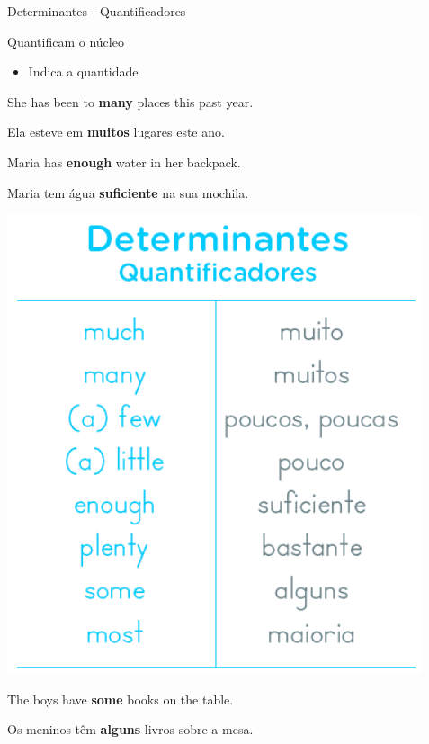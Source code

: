 \documentclass[compress,mathserif,xcolor=table]{beamer}
\begin{document}

\begin{frame}{Determinantes - Quantificadores}

\begin{minipage}{.54\textwidth}
Quantificam o núcleo
\begin{itemize}
    \item Indica a quantidade
\end{itemize}

\vspace{0.5cm}

She has been to \textbf{many} places this past year.

Ela esteve em \textbf{muitos} lugares este ano.

\vspace{0.25cm}

Maria has \textbf{enough} water in her backpack.

Maria tem água \textbf{suficiente} na sua mochila.

\end{minipage}
\begin{minipage}{.44\textwidth}
\includegraphics[width=\linewidth]{images/determinantes_quantificadores.png}
\end{minipage}

\vspace{0.5cm}

The boys have \textbf{some} books on the table.

Os meninos têm \textbf{alguns} livros sobre a mesa.

\end{frame}
\end{document}
